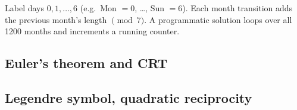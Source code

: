 \begin{remark}
Label days $0, 1, \ldots, 6$ (e.g.\ Mon $= 0$, \ldots, Sun $= 6$). Each month transition adds the previous month's length $\pmod 7$. A programmatic solution loops over all 1200 months and increments a running counter.
\end{remark}

\subsection{Euler's theorem and CRT}


\subsection{Legendre symbol, quadratic reciprocity}

